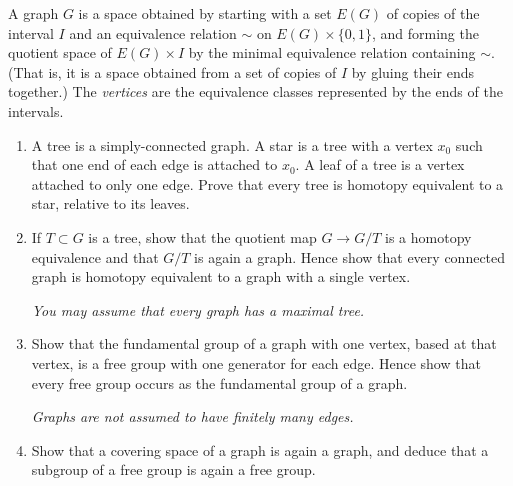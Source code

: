 \begin{problem}
A graph \(G\) is a space obtained by starting with a set \(E(G)\) of copies of the interval \(I\) and an equivalence relation \(\sim\) on \(E(G)\times \{0,1\}\), and forming the quotient space of \(E(G)\times I\) by the minimal equivalence relation containing \(\sim\). (That is, it is a space obtained from a set of copies of \(I\) by gluing their ends together.) The \emph{vertices} are the equivalence classes represented by the ends of the intervals.

\begin{enumerate}
	\item[(i)] A tree is a simply-connected graph. A star is a tree with a vertex \(x_0\) such that one end of each edge is attached to \(x_0\). A leaf of a tree is a vertex attached to only one edge. Prove that every tree is homotopy equivalent to a star, relative to its leaves.

	\item[(ii)] If \(T\subset G\) is a tree, show that the quotient map
	\(G\to G/T\) is a homotopy equivalence and that \(G/T\) is again a graph.
	Hence show that every connected graph is homotopy equivalent to a graph
	with a single vertex.

	\emph{You may assume that every graph has a maximal tree.}

	\item[(iii)] Show that the fundamental group of a graph with one vertex,
	based at that vertex, is a free group with one generator for each edge.
	Hence show that every free group occurs as the fundamental group of a graph.

	\emph{Graphs are not assumed to have finitely many edges.}

	\item[(iv)] Show that a covering space of a graph is again a graph, and deduce that a subgroup of a free group is again a free group.
\end{enumerate}

\par
\end{problem}

